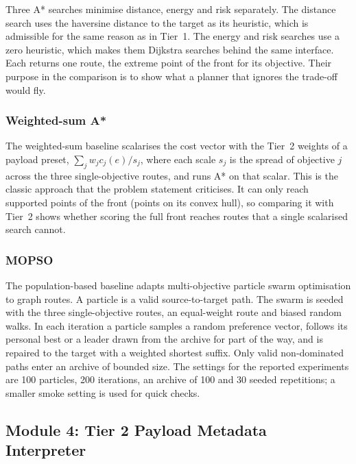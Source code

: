 \documentclass{ssnreview}
\begin{document}
Three A* searches minimise distance, energy and risk separately. The distance search
uses the haversine distance to the target as its heuristic, which is admissible for the
same reason as in Tier~1. The energy and risk searches use a zero heuristic, which makes
them Dijkstra searches behind the same interface. Each returns one route, the extreme
point of the front for its objective. Their purpose in the comparison is to show what a
planner that ignores the trade-off would fly.

\subsubsection{Weighted-sum A*}

The weighted-sum baseline scalarises the cost vector with the Tier~2 weights of a payload
preset, $\sum_j w_j c_j(e)/s_j$, where each scale $s_j$ is the spread of objective $j$
across the three single-objective routes, and runs A* on that scalar. This is the classic approach that the problem
statement criticises. It can only reach supported points of the front (points on its
convex hull), so comparing it with Tier~2 shows whether scoring the full front reaches
routes that a single scalarised search cannot.

\subsubsection{MOPSO}

The population-based baseline adapts multi-objective particle swarm optimisation
\cite{r6} to graph routes. A particle is a valid source-to-target path. The swarm is
seeded with the three single-objective routes, an equal-weight route and biased random
walks. In each iteration a particle samples a random preference vector, follows its
personal best or a leader drawn from the archive for part of the way, and is repaired to
the target with a weighted shortest suffix. Only valid non-dominated paths enter an
archive of bounded size. The settings for the reported experiments are 100 particles,
200 iterations, an archive of 100 and 30 seeded repetitions; a smaller smoke setting is
used for quick checks.

\subsection{Module 4: Tier 2 Payload Metadata Interpreter}\label{sec:m4}
\end{document}
